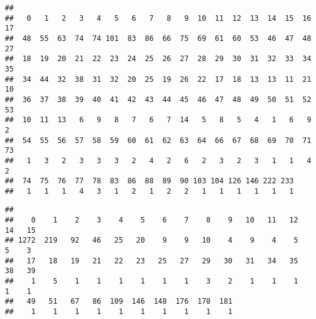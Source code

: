 \documentclass[]{article}
\newenvironment{Shaded}{\begin{snugshade}}{\end{snugshade}}
\newcommand{\KeywordTok}[1]{\textcolor[rgb]{0.13,0.29,0.53}{\textbf{#1}}}
\newcommand{\CommentTok}[1]{\textcolor[rgb]{0.56,0.35,0.01}{\textit{#1}}}
\newcommand{\ControlFlowTok}[1]{\textcolor[rgb]{0.13,0.29,0.53}{\textbf{#1}}}
\newcommand{\OperatorTok}[1]{\textcolor[rgb]{0.81,0.36,0.00}{\textbf{#1}}}
\newcommand{\NormalTok}[1]{#1}
\begin{document}
\begin{verbatim}
## 
##   0   1   2   3   4   5   6   7   8   9  10  11  12  13  14  15  16  17 
##  48  55  63  74  74 101  83  86  66  75  69  61  60  53  46  47  48  27 
##  18  19  20  21  22  23  24  25  26  27  28  29  30  31  32  33  34  35 
##  34  44  32  38  31  32  20  25  19  26  22  17  18  13  13  11  21  10 
##  36  37  38  39  40  41  42  43  44  45  46  47  48  49  50  51  52  53 
##  10  11  13   6   9   8   7   6   7  14   5   8   5   4   1   6   9   2 
##  54  55  56  57  58  59  60  61  62  63  64  66  67  68  69  70  71  73 
##   1   3   2   3   3   3   2   4   2   6   2   3   2   3   1   1   4   2 
##  74  75  76  77  78  83  86  88  89  90 103 104 126 146 222 233 
##   1   1   1   4   3   1   2   1   2   2   1   1   1   1   1   1
\end{verbatim}

\begin{Shaded}
\end{Shaded}

\begin{verbatim}
## 
##    0    1    2    3    4    5    6    7    8    9   10   11   12   14   15 
## 1272  219   92   46   25   20    9    9   10    4    9    4    5    5    3 
##   17   18   19   21   22   23   25   27   29   30   31   34   35   38   39 
##    1    5    1    1    1    1    1    1    3    2    1    1    1    1    1 
##   49   51   67   86  109  146  148  176  178  181 
##    1    1    1    1    1    1    1    1    1    1
\end{verbatim}

\begin{Shaded}
\end{Shaded}
\end{document}
